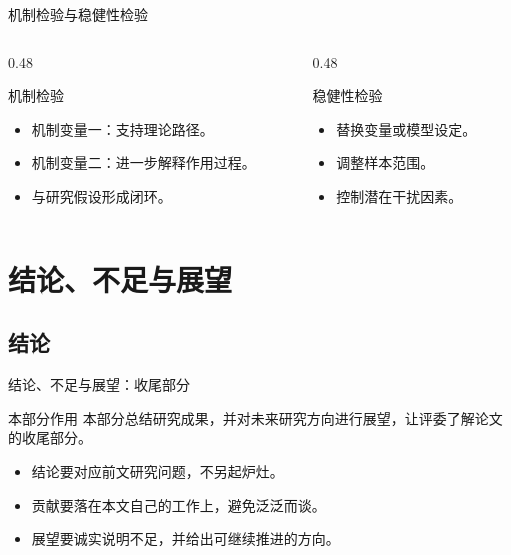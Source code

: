 \documentclass{beamer}
\begin{document}
\begin{frame}{机制检验与稳健性检验}
    \begin{columns}
        \begin{column}{0.48\textwidth}
            \begin{exampleblock}{机制检验}
                \begin{itemize}
                    \item 机制变量一：支持理论路径。
                    \item 机制变量二：进一步解释作用过程。
                    \item 与研究假设形成闭环。
                \end{itemize}
            \end{exampleblock}
        \end{column}
        \begin{column}{0.48\textwidth}
            \begin{exampleblock}{稳健性检验}
                \begin{itemize}
                    \item 替换变量或模型设定。
                    \item 调整样本范围。
                    \item 控制潜在干扰因素。
                \end{itemize}
            \end{exampleblock}
        \end{column}
    \end{columns}
\end{frame}

\section{结论、不足与展望}

\subsection{结论}

\begin{frame}{结论、不足与展望：收尾部分}
    \begin{block}{本部分作用}
        本部分总结研究成果，并对未来研究方向进行展望，让评委了解论文的收尾部分。
    \end{block}
    \begin{itemize}
        \item 结论要对应前文研究问题，不另起炉灶。
        \item 贡献要落在本文自己的工作上，避免泛泛而谈。
        \item 展望要诚实说明不足，并给出可继续推进的方向。
    \end{itemize}
\end{frame}
\end{document}
